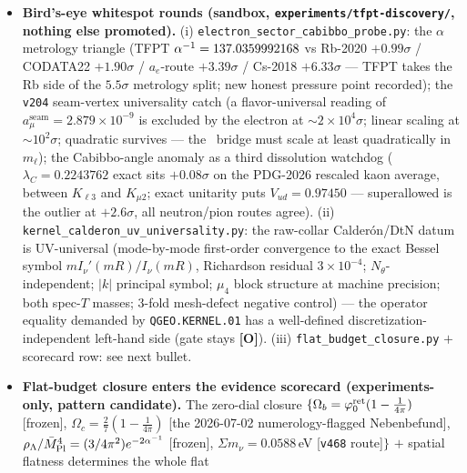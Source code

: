 \documentclass[11pt]{article}
\providecommand{\mO}{\textbf{[O]}}\providecommand{\mX}{\textbf{[X]}}
\providecommand{\Mbar}{\bar M_{\mathrm{Pl}}}\providecommand{\Z}{\mathbb{Z}}\providecommand{\PP}{\mathbb{P}}
\begin{document}
\begin{itemize}[leftmargin=1.5em]
$7/7$ checks; suite green through \texttt{v472} (466 modules); numerical (dense eigh $+$ FHS twist grid),
Python-only by nature. Papers updated: \texttt{tfpt\_1} (sixth honest step in the EM closure),
\texttt{tfpt\_research\_contracts} (residual certification), \texttt{tfpt\_safeguards} ($\alpha$-form
lever), root \texttt{README}, \texttt{zenodo\_description.html}. Exploration original:
\texttt{experiments/tfpt-discovery/quillen\_detline\_twist\_moduli.py} (same day).
\item \textbf{Bird's-eye whitespot rounds (sandbox, \texttt{experiments/tfpt-discovery/}, nothing else
promoted).} (i) \texttt{electron\_sector\_cabibbo\_probe.py}: the $\alpha$ metrology triangle (TFPT
$\alpha^{-1}=137.0359992168$ vs Rb-2020 $+0.99\sigma$ / CODATA22 $+1.90\sigma$ / $a_e$-route $+3.39\sigma$ /
Cs-2018 $+6.33\sigma$ --- TFPT takes the Rb side of the $5.5\sigma$ metrology split; new honest pressure
point recorded); the \texttt{v204} seam-vertex universality catch (a flavor-universal reading of
$a_\mu^{\mathrm{seam}}=2.879\times10^{-9}$ is excluded by the electron at ${\sim}2\times10^4\sigma$; linear
scaling at ${\sim}10^2\sigma$; quadratic survives --- the \mC\ bridge must scale at least quadratically in
$m_\ell$); the Cabibbo-angle anomaly as a third dissolution watchdog ($\lambda_C=0.2243762$ exact sits
$+0.08\sigma$ on the PDG-2026 rescaled kaon average, between $K_{\ell3}$ and $K_{\mu2}$; exact unitarity
puts $V_{ud}=0.97450$ --- superallowed is the outlier at $+2.6\sigma$, all neutron/pion routes agree).
(ii) \texttt{kernel\_calderon\_uv\_universality.py}: the raw-collar Calder\'on/DtN datum is UV-universal
(mode-by-mode first-order convergence to the exact Bessel symbol $m I_\nu'(mR)/I_\nu(mR)$, Richardson
residual $3\times10^{-4}$; $N_\theta$-independent; $|k|$ principal symbol; $\mu_4$ block structure at
machine precision; both spec-$T$ masses; $3$-fold mesh-defect negative control) --- the operator equality
demanded by \texttt{QGEO.KERNEL.01} has a well-defined discretization-independent left-hand side (gate
stays \mO). (iii) \texttt{flat\_budget\_closure.py} $+$ scorecard row: see next bullet.
\item \textbf{Flat-budget closure enters the evidence scorecard (experiments-only, pattern candidate).}
The zero-dial closure $\{\Omega_b=\varphi_0^{\mathrm{ret}}(1-\tfrac{1}{4\pi})$ [frozen], $\Omega_c=\tfrac27(1-\tfrac{1}{4\pi})$
[the 2026-07-02 numerology-flagged Nebenbefund], $\rho_\Lambda/\Mbar^4=(3/4\pi^2)e^{-2\ainv}$ [frozen],
$\Sigma m_\nu=0.0588$\,eV [\texttt{v468} route]$\}$ $+$ spatial flatness determines the whole flat

\end{itemize}
\end{document}
